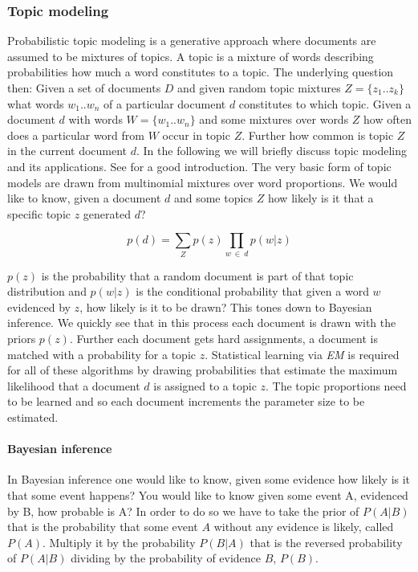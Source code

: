       \subsubsection{Topic modeling}
      \label{sec:topic_modelling}

        Probabilistic topic modeling is a generative approach where documents are assumed to be mixtures of topics. A topic is a mixture of words describing probabilities how much a word constitutes to a topic. The underlying question then: Given a set of documents $D$ and given random topic mixtures $Z=\{z_1..z_k\}$ what words $w_1..w_n$ of a particular document $d$ constitutes to which topic. Given a document $d$ with words $W=\{w_1..w_n\}$ and some mixtures over words $Z$ how often does a particular word from $W$ occur in topic $Z$. Further how common is topic $Z$ in the current document $d$. In the following we will briefly discuss topic modeling and its applications. See \cite{TopicModelsBlei2012} for a good introduction. The very basic form of topic models are drawn from multinomial mixtures over word proportions. We would like to know, given a document $d$ and some topics $Z$ how likely is it that a specific topic $z$ generated $d$?

          \begin{equation}
            p(d) = \sum_{Z} p(z) \prod_{w\:\in\:d}p(w|z)
          \end{equation}

        $p(z)$ is the probability that a random document is part of that topic distribution and $p(w|z)$ is the conditional probability that given a word $w$ evidenced by $z$, how likely is it to be drawn? This tones down to Bayesian inference. We quickly see that in this process each document is drawn with the priors $p(z)$. Further each document gets hard assignments, a document is matched with a probability for a topic $z$. Statistical learning via \emph{EM} is required for all of these algorithms by drawing probabilities that estimate the maximum likelihood that a document $d$ is assigned to a topic $z$. The topic proportions need to be learned and so each document increments the parameter size to be estimated.

        \paragraph{Bayesian inference}
          In Bayesian inference one would like to know, given some evidence how likely is it that some event happens? You would like to know given some event A, evidenced by B, how probable is A? In order to do so we have to take the prior of $P(A|B)$ that is the probability that some event $A$ without any evidence is likely, called $P(A)$. Multiply it by the probability $P(B|A)$ that is the reversed probability of $P(A|B)$ dividing by the probability of evidence $B$, $P(B)$.

